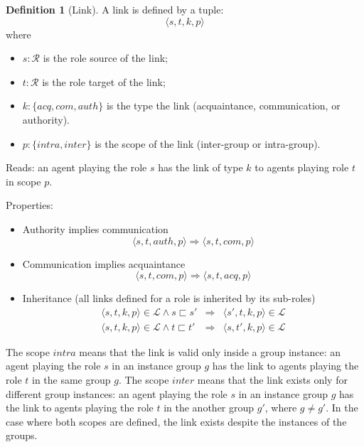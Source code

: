 \documentclass{article}
\newcommand{\set}[1]{\mathcal{#1}}
\newcommand{\subrole}{\sqsubset}
\theoremstyle{definition} \newtheorem{definition}{Definition}
\begin{document}
\begin{definition}[Link]
  A link is defined by a tuple:
  \begin{displaymath}
    \langle s, t, k, p \rangle
  \end{displaymath}
  where
  \begin{itemize}
  \item $s : \set{R}$ is the role source of the link;
  \item $t : \set{R}$ is the role target of the link;
  \item $k : \{ acq, com, auth\}$ is the type the link
    (acquaintance, communication, or authority).
  \item $p : \{ intra, inter \}$ is the scope of the link
    (inter-group or intra-group).
  \end{itemize}

  Reads: an agent playing the role $s$ has the link of type $k$ to
  agents playing role $t$ in scope $p$.

  Properties:
  \begin{itemize}
  \item Authority implies communication
    \begin{equation}
       \langle s, t, auth, p \rangle \Rightarrow  \langle s, t, com, p \rangle
    \end{equation}

  \item Communication implies acquaintance
    \begin{equation}
       \langle s, t, com, p \rangle \Rightarrow  \langle s, t, acq, p \rangle
    \end{equation}

  \item Inheritance (all links defined for a role is inherited by its sub-roles)
    \begin{eqnarray}
    \langle s, t, k, p \rangle \in \set{L} \land s \subrole s' &\Rightarrow&  \langle s', t, k, p \rangle \in \set{L}\\
    \langle s, t, k, p \rangle \in \set{L} \land t \subrole t' &\Rightarrow&  \langle s, t', k, p \rangle  \in \set{L}
    \end{eqnarray}

  \end{itemize}
\end{definition}

The scope $intra$ means that the link is valid only inside a group
instance: an agent playing the role $s$ in an instance group $g$ has
the link to agents playing the role $t$ in the same group $g$. The
scope $inter$ means that the link exists only for different group
instances: an agent playing the role $s$ in an instance group $g$ has
the link to agents playing the role $t$ in the another group $g'$,
where $g \neq g'$. In the case where both scopes are defined, the link
exists despite the instances of the groups.
\end{document}
